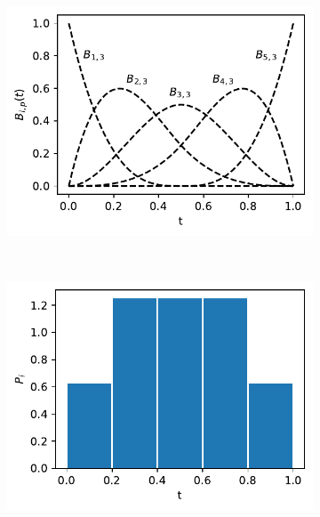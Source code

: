 \documentclass[../Thesis.tex]{subfiles}
\begin{document}
\begin{figure}[ht]
    \centering
    \begin{subfigure}[t]{0.49\textwidth}
        \centering
        \includegraphics[width=\linewidth]{figures/MI estimation/B-spline basis functions - degree 3.pdf}
        \caption{}
        \label{subfig:B-spline fuctions}
    \end{subfigure}%
    ~
    \begin{subfigure}[t]{0.49\textwidth}
        \centering
        \includegraphics[width=\linewidth]{figures/MI estimation/B-spline marginal dist - degree 3.pdf}
        \caption{}
        \label{subfig:B-spline marginals}
    \end{subfigure}
    \caption{}
    \label{fig:B-splines}
\end{figure}
\end{document}
